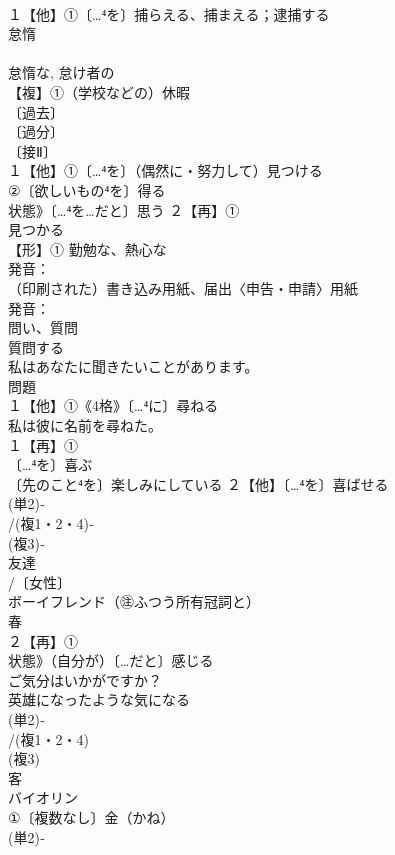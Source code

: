 \documentclass[8pt]{extreport}
\begin{document}
\begin{CJK}{UTF8}{min}
\\	１【他】①〔…⁴を〕捕らえる、捕まえる；逮捕する
\\	怠惰
\\	[派生] 
\\	怠惰な, 怠け者の
\\	【複】①（学校などの）休暇
\\	〔過去〕
\\	〔過分〕
\\	〔接Ⅱ〕
\\	１【他】①〔…⁴を〕（偶然に・努力して）見つける
\\	②〔欲しいもの⁴を〕得る　
\\	状態》〔…⁴を…だと〕思う ２【再】①
\\	見つかる
\\	【形】① 勤勉な、熱心な
\\	発音：
\\	（印刷された）書き込み用紙、届出〈申告・申請〉用紙
\\	発音：
\\	問い、質問
\\	質問する 
\\	私はあなたに聞きたいことがあります。 
\\	問題
\\	１【他】①《4格》〔…⁴に〕尋ねる
\\	私は彼に名前を尋ねた。
\\	１【再】①
\\	〔…⁴を〕喜ぶ 
\\	〔先のこと⁴を〕楽しみにしている ２【他】〔…⁴を〕喜ばせる
\\	(単2)‐
\\	/(複1・2・4)‐
\\	(複3)‐
\\	友達 
\\	/〔女性〕
\\	ボーイフレンド（㊟ふつう所有冠詞と）
\\	春 
\\	２【再】①
\\	状態》（自分が）〔…だと〕感じる 
\\	ご気分はいかがですか？ 
\\	英雄になったような気になる
\\	(単2)‐
\\	/(複1・2・4)
\\	(複3)
\\	客
\\	バイオリン
\\	①〔複数なし〕金（かね）
\\	(単2)‐

\end{CJK}
\end{document}
